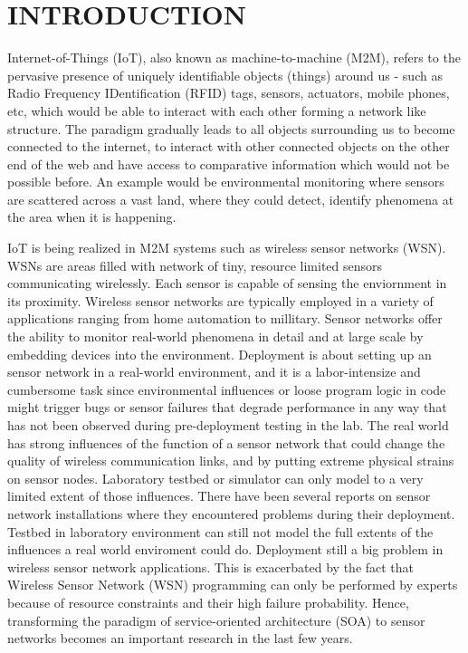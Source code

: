 \cleardoublepage
\singlespacing
\chapter{INTRODUCTION}
\label{c:intro}
\doublespacing\nointerlineskip

Internet-of-Things (IoT), also known as machine-to-machine (M2M), refers to the
pervasive presence of uniquely identifiable objects (things) around us - such as
Radio Frequency IDentification (RFID) tags, sensors,
actuators, mobile phones, etc, which would be able to interact with each
other forming a network like structure. 
The paradigm gradually leads to all objects surrounding us to become connected
to the internet, to interact with other connected objects on the other end of
the web and have access to comparative information which would not be possible
before.
An example would be environmental monitoring where sensors are scattered across
a vast land, where they could detect, identify phenomena at the area when it is
happening. 

IoT is being realized in M2M systems such as wireless sensor networks (WSN).
WSNs are areas filled with network of tiny, resource limited sensors
communicating wirelessly. Each sensor is capable of sensing the enviornment in
its proximity. Wireless sensor networks are typically employed in a variety of
applications ranging from home automation to millitary.
Sensor networks offer the ability to monitor real-world phenomena in detail and
at large scale by embedding devices into the environment. Deployment is
about setting up an sensor network in a real-world environment, and it is
a labor-intensize and cumbersome task since environmental influences or
loose program logic in code might trigger bugs or sensor failures that
degrade performance in any way that has not been observed during pre-deployment
testing in the lab.
The real world has strong influences of the function of a sensor network that
could change the quality of wireless communication links, and by putting
extreme physical strains on sensor nodes. Laboratory testbed or simulator can 
only model to a very limited extent of those influences.
There have been several reports on sensor network installations where they
encountered problems during their
deployment\cite{Barrenetxea2008,Polastre2004,Arora2004,Tateson2005,Padhy2005,Stoianov2007,Tolle2005,Werner-Allen2006a}.
Testbed in laboratory environment can still not model the full extents of the
influences a real world enviroment could do. Deployment still a big problem in
wireless sensor network applications.
This is exacerbated by the fact that Wireless Sensor Network (WSN) programming
can only be performed by experts because of resource constraints and their high
failure probability. Hence, transforming the paradigm of service-oriented
architecture (SOA) to sensor networks becomes an important research in the last
few years.~\cite{Koutsoukos2007,Hughes2012}

